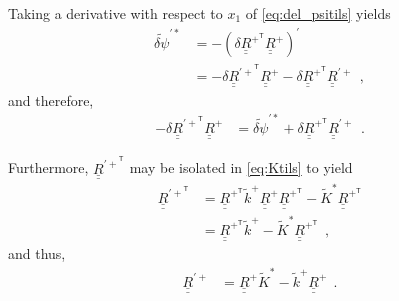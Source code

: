 \documentclass[12pt,a4paper,oneside,english]{abntex2} %
\def\tens#1{\underline{\underline{#1}}}
\def\til#1{\widetilde{#1}}
\def\lp{\left(}
\def\rp{\right)}
\def\T{\mathsf{T}}
\def\xo{x_1}
\def\R{\tens{R}}
\def\Rp{\R^+}
\def\RpT{\R^{+^\T}}
\def\Rpprime{\R^{\prime +}}
\def\RpprimeT{\R^{{\prime +}^\T}}
\def\ktil{\til{k}}
\def\ktilp{\ktil^{+}}
\def\Ktil{\til{K}}
\def\Ktils{\Ktil^{*}}
\def\delpsitilps{\til{\delta\psi}^{\prime*}}
\begin{document}
\begin{apendicesenv}
Taking a derivative with respect to $\xo$ of \cref{eq:del_psitils} yields
\begin{align}
    \delpsitilps &=  -\lp\delta\RpT\Rp\rp^\prime \nonumber 
    \\
    &= -\delta\RpprimeT\Rp - \delta\RpT\Rpprime \ \ ,
    \label{eq:del_psitilps}
\end{align}
and therefore,
\begin{align}
    -\delta\RpprimeT\Rp &= \delpsitilps + \delta\RpT\Rpprime \ \ .
    \label{eq:del_RpprimeTRp}
\end{align}

Furthermore, $\RpprimeT$ may be isolated in \cref{eq:Ktils} to yield
\begin{align}
    \RpprimeT &= \RpT\ktilp\Rp\RpT - \Ktils\RpT
    \nonumber 
    \\
    &= \RpT\ktilp - \Ktils\RpT \ \ ,\label{eq:RpprimeT} 
\end{align}
and thus,
\begin{align}
    \Rpprime &= \Rp\Ktils - \ktilp\Rp \ \ .
    \label{eq:Rpprime}
\end{align}


\end{apendicesenv}
\end{document}
